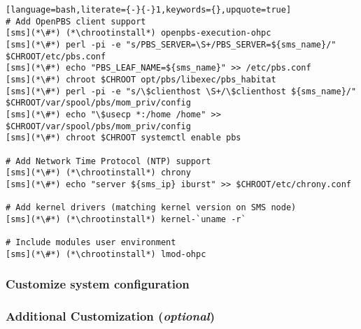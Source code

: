 \documentclass[letterpaper]{article}
\newcommand{\chrootinstall}{yum -y --installroot=\$CHROOT install}
\begin{document}
\begin{lstlisting}[language=bash,literate={-}{-}1,keywords={},upquote=true]
# Add OpenPBS client support
[sms](*\#*) (*\chrootinstall*) openpbs-execution-ohpc
[sms](*\#*) perl -pi -e "s/PBS_SERVER=\S+/PBS_SERVER=${sms_name}/" $CHROOT/etc/pbs.conf
[sms](*\#*) echo "PBS_LEAF_NAME=${sms_name}" >> /etc/pbs.conf
[sms](*\#*) chroot $CHROOT opt/pbs/libexec/pbs_habitat
[sms](*\#*) perl -pi -e "s/\$clienthost \S+/\$clienthost ${sms_name}/" $CHROOT/var/spool/pbs/mom_priv/config
[sms](*\#*) echo "\$usecp *:/home /home" >> $CHROOT/var/spool/pbs/mom_priv/config
[sms](*\#*) chroot $CHROOT systemctl enable pbs

# Add Network Time Protocol (NTP) support
[sms](*\#*) (*\chrootinstall*) chrony
[sms](*\#*) echo "server ${sms_ip} iburst" >> $CHROOT/etc/chrony.conf

# Add kernel drivers (matching kernel version on SMS node)
[sms](*\#*) (*\chrootinstall*) kernel-`uname -r`

# Include modules user environment
[sms](*\#*) (*\chrootinstall*) lmod-ohpc
\end{lstlisting}

\subsubsection{Customize system configuration} \label{sec:master_customization}




\subsubsection{Additional Customization ({\em optional})} \label{sec:addl_customizations}



\end{document}

